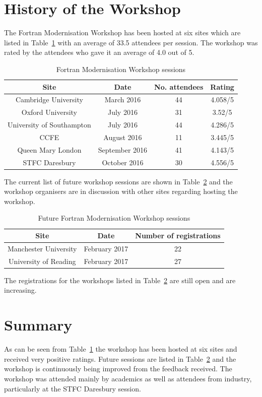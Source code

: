 \documentclass[12pt]{article}
\begin{document}
\section{History of the Workshop}
The Fortran Modernisation Workshop has been hosted at six sites which are listed in Table~\ref{fmw:sites} with an
average of 33.5 attendees per session. The workshop was rated by the attendees who gave it an average of 4.0 out of 5.
\begin{table}[H]
\centering 
\begin{tabular}{|c|c|c|c|}
\hline
{\bf Site} & {\bf Date} & {\bf No. attendees} & {\bf Rating} \\ \hline
Cambridge University & March 2016 & 44 & 4.058/5 \\ \hline
Oxford University & July 2016 & 31 & 3.52/5 \\ \hline 
University of Southampton & July 2016 & 44 & 4.286/5 \\ \hline
CCFE & August 2016 & 11 & 3.445/5 \\ \hline
Queen Mary London & September 2016 & 41 & 4.143/5 \\ \hline
STFC Daresbury & October 2016 & 30 & 4.556/5 \\ \hline
\end{tabular}
\caption{Fortran Modernisation Workshop sessions}
\label{fmw:sites}
\end{table}
The current list of future workshop sessions are shown in Table~\ref{fmw:future} and the workshop organisers are in
discussion with other sites regarding hosting the workshop. 
\begin{table}[H]
\centering 
\begin{tabular}{|c|c|c|}
\hline
{\bf Site} & {\bf Date} & {\bf Number of registrations} \\ \hline
Manchester University & February 2017 & 22 \\ \hline
University of Reading & February 2017 & 27 \\ \hline 
\end{tabular}
\caption{Future Fortran Modernisation Workshop sessions}
\label{fmw:future}
\end{table}
The registrations for the workshops listed in Table~\ref{fmw:future} are still open and are increasing. 
\section{Summary}
As can be seen from Table~\ref{fmw:sites} the workshop has been hosted at six sites and received very positive ratings.
Future sessions are listed in Table~\ref{fmw:future} and the workshop is continuously being improved from the feedback received.
The workshop was attended mainly by academics as well as attendees from industry, particularly at the STFC Daresbury session. \\
\end{document}

